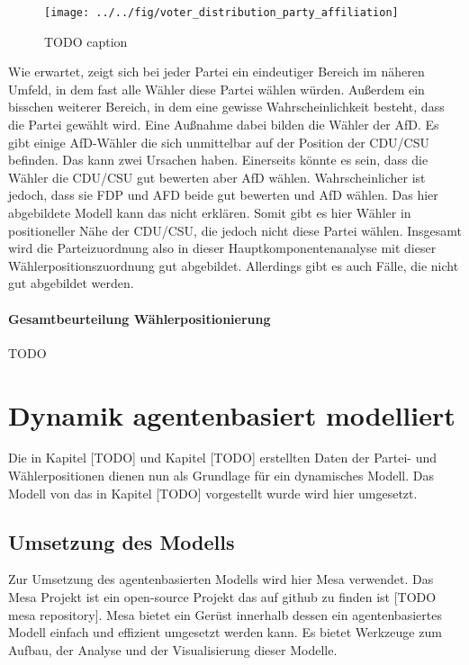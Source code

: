 \begin{figure}[htb]
	\centering
	\texttt{[image: ../../fig/voter\_distribution\_party\_affiliation]}
	\caption{TODO caption}
	\label{fig:voter-positions-pca-party-affiliation}
\end{figure}

Wie erwartet, zeigt sich bei jeder Partei ein eindeutiger Bereich im näheren Umfeld, in dem fast alle Wähler diese Partei wählen würden. Außerdem ein bisschen weiterer Bereich, in dem eine gewisse Wahrscheinlichkeit besteht, dass die Partei gewählt wird. Eine Außnahme dabei bilden die Wähler der AfD. Es gibt einige AfD-Wähler die sich unmittelbar auf der Position der CDU/CSU befinden. Das kann zwei Ursachen haben. Einerseits könnte es sein, dass die Wähler die CDU/CSU gut bewerten aber AfD wählen. Wahrscheinlicher ist jedoch, dass sie FDP und AFD beide gut bewerten und AfD wählen. Das hier abgebildete Modell kann das nicht erklären. Somit gibt es hier Wähler in positioneller Nähe der CDU/CSU, die jedoch nicht diese Partei wählen. Insgesamt wird die Parteizuordnung also in dieser Hauptkomponentenanalyse mit dieser Wählerpositionszuordnung gut abgebildet. Allerdings gibt es auch Fälle, die nicht gut abgebildet werden.

\paragraph{Gesamtbeurteilung Wählerpositionierung}
TODO

\section{Dynamik agentenbasiert modelliert}

Die in Kapitel [TODO] und Kapitel [TODO] erstellten Daten der Partei- und Wählerpositionen dienen nun als Grundlage für ein dynamisches Modell. Das Modell von \cite{laver2005policy} das in Kapitel [TODO] vorgestellt wurde wird hier umgesetzt.

\subsection{Umsetzung des Modells}

Zur Umsetzung des agentenbasierten Modells wird hier Mesa \citep{mesa2020} verwendet. Das Mesa Projekt ist ein open-source Projekt das auf github zu finden ist [TODO mesa repository]. 
Mesa bietet ein Gerüst innerhalb dessen ein agentenbasiertes Modell einfach und effizient umgesetzt werden kann. Es bietet Werkzeuge zum Aufbau, der Analyse und der Visualisierung dieser Modelle.

